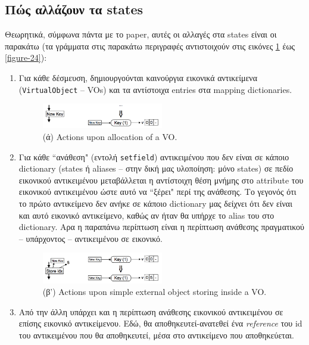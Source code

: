 \subsection{Πώς αλλάζουν τα states}

Θεωρητικά, σύμφωνα πάντα με το paper, αυτές οι αλλαγές στα states είναι οι
παρακάτω (τα γράμματα στις παρακάτω περιγραφές αντιστοιχούν στις εικόνες
\ref{figure-21} έως \ref{figure-24}):

\begin{enumerate}[label=\alph*]

\item Για κάθε δέσμευση, δημιουργούνται καινούργια εικονικά αντικείμενα \\
(\texttt{VirtualObject} – VOs) και τα αντίστοιχα entries στα mapping
dictionaries.

\begin{figure}[h]
\centering
\includegraphics[width=0.5\textwidth]{virtual-alloc.png}
\caption{(ά) Actions upon allocation of a VO.}
\label{figure-21}
\end{figure}

\item Για κάθε ``ανάθεση" (εντολή \texttt{setfield}) αντικειμένου που δεν είναι
σε κάποιο dictionary (states ή aliases – στην δική μας υλοποίηση: μόνο states)
σε πεδίο εικονικού αντικειμένου μεταβάλλεται η αντίστοιχη θέση μνήμης στο
attribute του εικονικού αντικειμένου ώστε αυτό να ``ξέρει" περί της ανάθεσης. Το
γεγονός ότι το πρώτο αντικείμενο δεν ανήκε σε κάποιο dictionary μας δείχνει ότι
δεν είναι και αυτό εικονικό αντικείμενο, καθώς αν ήταν θα υπήρχε το alias του
στο dictionary. Αρα η παραπάνω περίπτωση είναι η περίπτωση ανάθεσης πραγματικού
– υπάρχοντος – αντικειμένου σε εικονικό.

\begin{figure}[h]
\centering
\includegraphics[width=0.5\textwidth]{virtual-ext-store.png}
\caption{(β') Actions upon simple external object storing inside a VO.}
\label{figure-22}
\end{figure}

\item Από την άλλη υπάρχει και η περίπτωση ανάθεσης εικονικού αντικειμένου σε
επίσης εικονικό αντικείμενου. Εδώ, θα αποθηκευτεί-ανατεθεί ένα
\textit{reference} του id του αντικειμένου που θα αποθηκευτεί, μέσα στο
αντικείμενο που αποθηκεύεται.


\end{enumerate}
